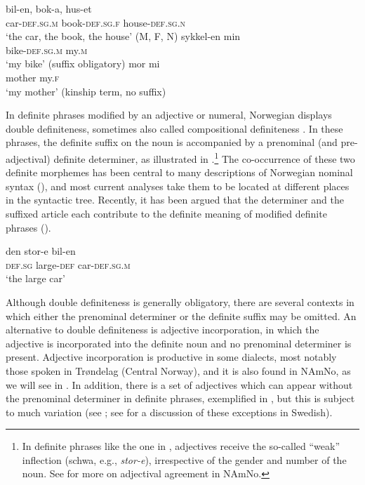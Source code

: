 \documentclass[output=paper]{langscibook}
\begin{document}
\ea \label{ex:vanbaal:4}
\gll bil-en, bok-a, hus-et \\
    car-\textsc{def.sg.m} book-\textsc{def.sg.f} house-\textsc{def.sg.n} \\
\glt `the car, the book, the house' (M, F, N)
\ex \label{ex:vanbaal:5}
\ea  \label{ex:vanbaal:5a}
\gll sykkel-en min \\
    bike-\textsc{def.sg.m} my.\textsc{m} \\
\glt `my bike' (suffix obligatory)
\ex \label{ex:vanbaal:5b}
\gll mor mi \\
    mother my.\textsc{f} \\
\glt `my mother' (kinship term, no suffix) \\
\citep[2--3]{Kinn2021}
\z
\z

In definite phrases modified by an adjective or numeral, Norwegian displays double definiteness, sometimes also called compositional definiteness \citep{Anderssen2012}. In these phrases, the definite suffix on the noun is accompanied by a prenominal (and pre-adjectival) definite determiner, as illustrated in .\footnote{In definite phrases like the one in , adjectives receive the so-called ``weak'' inflection (schwa, e.g., \textit{stor-e}), irrespective of the gender and number of the noun. See  for more on adjectival agreement in NAmNo.} The co-occurrence of these two definite morphemes has been central to many descriptions of Norwegian nominal syntax (\citealt{Taraldsen1990, Delsing1993, Santelmann1993, Kester1993,Kester1996, Vangsnes1999, Julien2002Determiners, Julien2005, Anderssen2006,Anderssen2012}), and most current analyses take them to be located at different places in the syntactic tree. Recently, it has been argued that the determiner and the suffixed article each contribute to the definite meaning of modified definite phrases (\citealt{Julien2002Determiners,Julien2005, Anderssen2006,Anderssen2012}).


\ea \label{ex:vanbaal:6}
\gll den stor-e bil-en \\
    \textsc{def.sg} large-\textsc{def} car-\textsc{def.sg.m} \\
\glt `the large car' 
\z  

\begin{sloppypar}
Although double definiteness is generally obligatory, there are several contexts in which either the prenominal determiner or the definite suffix may be omitted. An alternative to double definiteness is adjective incorporation, in which the adjective is incorporated into the definite noun and no prenominal determiner is present. Adjective incorporation is productive in some dialects, most notably those spoken in Trøndelag (Central Norway), and it is also found in NAmNo, as we will see in . In addition, there is a set of adjectives which can appear without the prenominal determiner in definite phrases, exemplified in , but this is subject to much variation (see \citealt{vanBaal2024}; see \citealt[124--125]{Dahl2015} for a discussion of these exceptions in Swedish).
\end{sloppypar}
\end{document}
